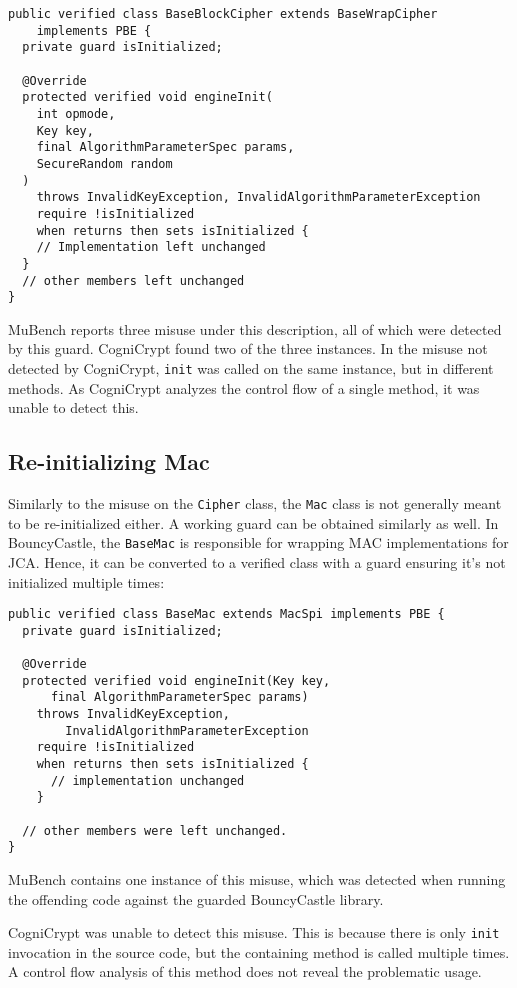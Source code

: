 \documentclass{article}
\begin{document}
\begin{lstlisting}[style=jGuard]
public verified class BaseBlockCipher extends BaseWrapCipher 
    implements PBE {
  private guard isInitialized;

  @Override
  protected verified void engineInit(
    int opmode,
    Key key,
    final AlgorithmParameterSpec params,
    SecureRandom random
  )
    throws InvalidKeyException, InvalidAlgorithmParameterException
    require !isInitialized
    when returns then sets isInitialized {
    // Implementation left unchanged
  }
  // other members left unchanged
}
\end{lstlisting}

MuBench reports three misuse under this description, all of which were detected
by this guard.
CogniCrypt found two of the three instances.
In the misuse not detected by CogniCrypt, \texttt{init} was called on the same instance,
but in different methods. As CogniCrypt analyzes the control flow of a single method, it
was unable to detect this.

\subsection{Re-initializing Mac}

Similarly to the misuse on the \texttt{Cipher} class, the \texttt{Mac} class is not generally meant to
be re-initialized either.
A working guard can be obtained similarly as well. In BouncyCastle, the \texttt{BaseMac} is responsible
for wrapping MAC implementations for JCA.
Hence, it can be converted to a verified class with a guard ensuring it's not initialized multiple
times:

\begin{lstlisting}[style=jGuard]
public verified class BaseMac extends MacSpi implements PBE {
  private guard isInitialized;

  @Override
  protected verified void engineInit(Key key, 
      final AlgorithmParameterSpec params)
    throws InvalidKeyException,
        InvalidAlgorithmParameterException
    require !isInitialized
    when returns then sets isInitialized {
      // implementation unchanged
    }

  // other members were left unchanged.
}
\end{lstlisting}

MuBench contains one instance of this misuse, which was detected when running the offending
code against the guarded BouncyCastle library.

CogniCrypt was unable to detect this misuse. This is because there is only \texttt{init}
invocation in the source code, but the containing method is called multiple times.
A control flow analysis of this method does not reveal the problematic usage.
\end{document}

